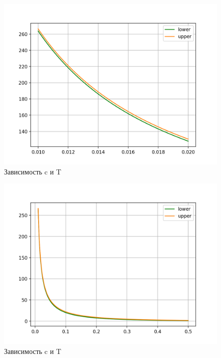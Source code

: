 \documentclass[times,specification,annotation]{itmo-student-thesis}
\begin{document}
    \begin{figure}[H]
        \centering
        \caption{Зависимость c и T}
        \label{pic:sublists-metafile}
        \includegraphics[scale=0.8]{kf_01_02.png}
    \end{figure}
    \begin{figure}[H]
        \centering
        \caption{Зависимость c и T}
        \label{pic:sublists-metafile}
        \includegraphics[scale=0.8]{kf_01_5.png}
    \end{figure}
\end{document}
